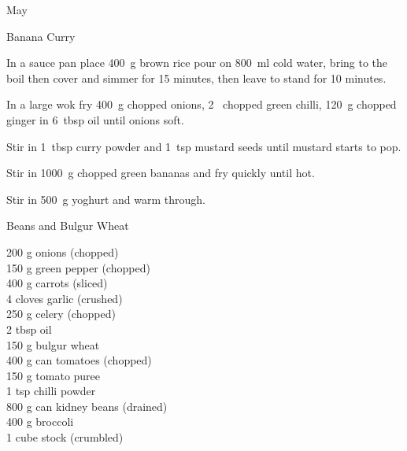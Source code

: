 \begin{menu}{May}
\begin{recipe}{2}{Banana Curry}
\begin{ingredients}
		\end{ingredients}
	
	
	
    \begin{instructions}
    \item 
    In a
    sauce pan
    place
    400~g  brown rice
    pour on
    800~ml  cold water,
    bring to the boil then cover and simmer for 15 minutes,
    then leave to stand for 10 minutes.
  \item 
        In a large wok fry
        400~g chopped onions,
        2~ chopped green chilli,
        120~g chopped ginger
        in
        6~tbsp  oil
        until onions soft.
      \item 
        Stir in
        1~tbsp  curry powder
        and
        1~tsp  mustard seeds
        until mustard starts to pop.
      \item 
        Stir in
        1000~g chopped green bananas
        and fry quickly until hot.
      \item 
        Stir in 500~g  yoghurt and warm through.
      
    \end{instructions}
    \end{recipe}%
  
    \begin{recipe}{2}{Beans and Bulgur Wheat}%
		\begin{ingredients}
		200 g onions (chopped) \\
	150 g green pepper (chopped) \\
	400 g carrots (sliced) \\
	4 cloves garlic (crushed) \\
	250 g celery (chopped) \\
	2 tbsp oil  \\
	150 g bulgur wheat  \\
	400 g can tomatoes (chopped) \\
	150 g tomato puree  \\
	1 tsp chilli powder  \\
	800 g can kidney beans (drained) \\
	400 g broccoli  \\
	1 cube stock (crumbled) \\
	
		\end{ingredients}
	
	

\end{recipe}
\end{menu}
